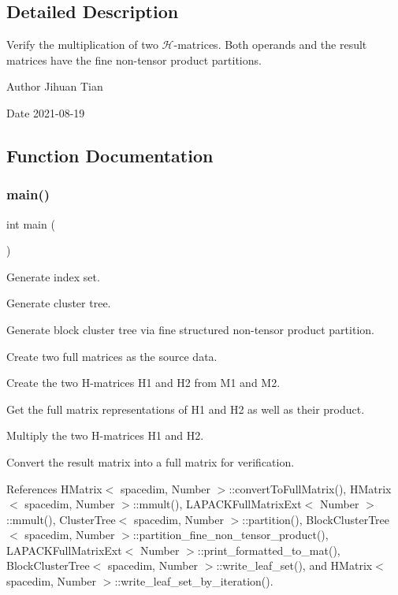 \subsection{Detailed Description}
Verify the multiplication of two $\mathcal{H}$-\/matrices. Both operands and the result matrices have the fine non-\/tensor product partitions. 

\begin{DoxyAuthor}{Author}
Jihuan Tian 
\end{DoxyAuthor}
\begin{DoxyDate}{Date}
2021-\/08-\/19 
\end{DoxyDate}


\subsection{Function Documentation}
\mbox{\label{hmatrix-hmatrix-mmult-all-fine-ntp_8cc_ae66f6b31b5ad750f1fe042a706a4e3d4}} 
\subsubsection{\texorpdfstring{main()}{main()}}
{\footnotesize\ttfamily int main (\begin{DoxyParamCaption}{ }\end{DoxyParamCaption})}

Generate index set.

Generate cluster tree.

Generate block cluster tree via fine structured non-\/tensor product partition.

Create two full matrices as the source data.

Create the two H-\/matrices {\ttfamily H1} and {\ttfamily H2} from {\ttfamily M1} and {\ttfamily M2}.

Get the full matrix representations of {\ttfamily H1} and {\ttfamily H2} as well as their product.

Multiply the two H-\/matrices {\ttfamily H1} and {\ttfamily H2}.

Convert the result matrix into a full matrix for verification.

References H\+Matrix$<$ spacedim, Number $>$\+::convert\+To\+Full\+Matrix(), H\+Matrix$<$ spacedim, Number $>$\+::mmult(), L\+A\+P\+A\+C\+K\+Full\+Matrix\+Ext$<$ Number $>$\+::mmult(), Cluster\+Tree$<$ spacedim, Number $>$\+::partition(), Block\+Cluster\+Tree$<$ spacedim, Number $>$\+::partition\+\_\+fine\+\_\+non\+\_\+tensor\+\_\+product(), L\+A\+P\+A\+C\+K\+Full\+Matrix\+Ext$<$ Number $>$\+::print\+\_\+formatted\+\_\+to\+\_\+mat(), Block\+Cluster\+Tree$<$ spacedim, Number $>$\+::write\+\_\+leaf\+\_\+set(), and H\+Matrix$<$ spacedim, Number $>$\+::write\+\_\+leaf\+\_\+set\+\_\+by\+\_\+iteration().

